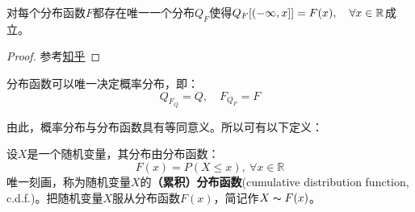 \begin{proposition}
    对每个分布函数$F$都存在唯一一个分布$Q_F$使得$Q_F[(-\infty,x]]=F(x), \quad \forall x \in \mathbb{R}$成立。
\end{proposition}
\begin{proof}
    参考\href{https://www.zhihu.com/question/23022012/answer/2520636971}{知乎}
\end{proof}

\begin{theorem}
    分布函数可以唯一决定概率分布，即：
    \[ Q_{F_Q}=Q, \quad F_{Q_F}=F \]
\end{theorem}
由此，概率分布与分布函数具有等同意义。所以可有以下定义：
\begin{definition}[随机变量的分布函数]
    设$X$是一个随机变量，其分布由分布函数：
    \[ F(x)=P(X \le x),\ \forall x \in \mathbb{R} \]
    唯一刻画，称为随机变量$X$的\textbf{（累积）分布函数}(cumulative distribution function, c.d.f.)。把随机变量$X$服从分布函数$F(x)$，简记作$X \thicksim F(x)$。
\end{definition}

